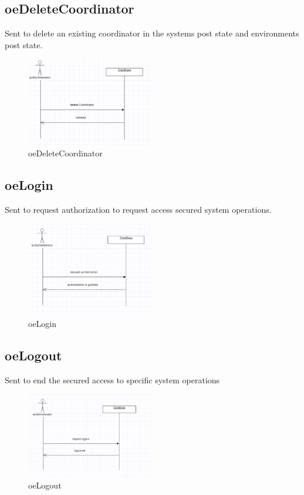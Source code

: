 \subsection{oeDeleteCoordinator}
Sent to delete an existing coordinator in the systems post state and
environments post state.
\begin{figure}[H]
\begin{center}
\includegraphics[width=0.5\textwidth]{./images/oeDeleteCoordinator.eps} 
\end{center}
\caption{oeDeleteCoordinator}
\end{figure}

\subsection{oeLogin}
Sent to request authorization to request access secured system operations.
\begin{figure}[H]
\begin{center}
\includegraphics[width=0.5\textwidth]{./images/oeLogin.eps} 
\end{center}
\caption{oeLogin}
\end{figure}

\subsection{oeLogout}
Sent to end the secured access to specific system operations

\begin{figure}[H]
\begin{center}
\includegraphics[width=0.5\textwidth]{./images/oeLogout.eps} 
\end{center}
\caption{oeLogout}
\end{figure}

